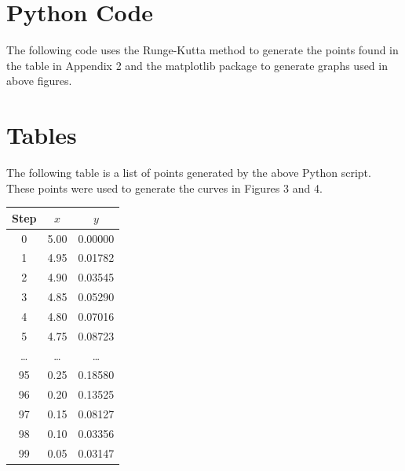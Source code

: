\documentclass{article}
\begin{document}
    \begin{appendices}
        \section{Python Code}
        The following code uses the Runge-Kutta method to generate the points
        found in the table in Appendix 2 and the matplotlib package to generate
        graphs used in above figures.

        

        \section{Tables}
        The following table is a list of points generated by the above Python
        script. These points were used to generate the curves in Figures 3 and
        4.

        \centering
        \begin{tabular}{ |c|c|c| }
            \hline
            Step & $x$ & $y$ \\
            \hline
            0  &  5.00 &  0.00000 \\
            1  &  4.95 &  0.01782 \\
            2  &  4.90 &  0.03545 \\
            3  &  4.85 &  0.05290 \\
            4  &  4.80 &  0.07016 \\
            5  &  4.75 &  0.08723 \\
            \dots & \dots & \dots \\
            95 &  0.25 &  0.18580 \\
            96 &  0.20 &  0.13525 \\
            97 &  0.15 &  0.08127 \\
            98 &  0.10 &  0.03356 \\
            99 &  0.05 &  0.03147 \\
            \hline
        \end{tabular}

    \end{appendices}
\end{document}
